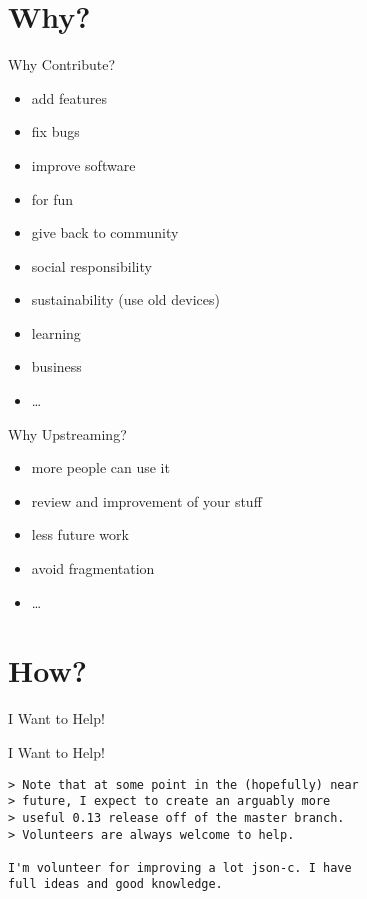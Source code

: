 \documentclass{beamer}
\begin{document}
\section{Why?}

\frame{\tableofcontents[currentsection]}

\begin{frame}{Why Contribute?}
    \begin{itemize}
        \item add features
        \item fix bugs
        \item improve software
        \item for fun
        \item give back to community
        \item social responsibility
        \item sustainability (use old devices)
        \item learning
        \item business
        \item \dots
    \end{itemize}
\end{frame}

\begin{frame}{Why Upstreaming?}
    \begin{itemize}
        \item more people can use it
        \item review and improvement of your stuff
        \item less future work
        \item avoid fragmentation
        \item \dots
    \end{itemize}
\end{frame}


\section{How?}

\frame{\tableofcontents[currentsection]}

\begin{frame}[fragile]{I Want to Help!}
\end{frame}

\begin{frame}[fragile]{I Want to Help!}
    \begin{verbatim}
> Note that at some point in the (hopefully) near
> future, I expect to create an arguably more
> useful 0.13 release off of the master branch.
> Volunteers are always welcome to help.

I'm volunteer for improving a lot json-c. I have
full ideas and good knowledge.
    \end{verbatim}
\end{frame}
\end{document}
